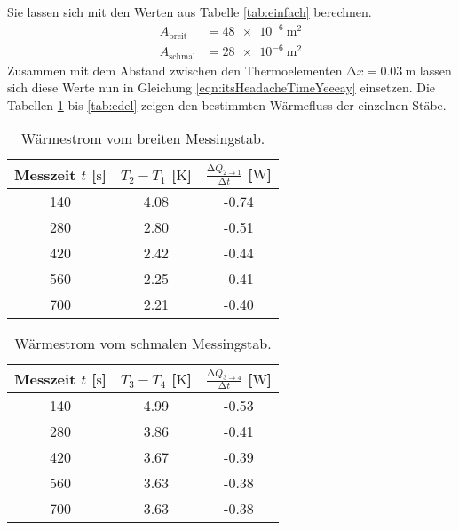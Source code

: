 Sie lassen sich mit den Werten aus Tabelle \ref{tab:einfach} berechnen. 
\begin{align}
A_{\text{breit}} &= \SI{48e-6}{\meter\squared}\\
A_{\text{schmal}} &= \SI{28e-6}{\meter\squared}
\end{align}
Zusammen mit dem Abstand zwischen den Thermoelementen $\increment x = \SI{0.03}{\meter}$ lassen sich diese Werte nun in Gleichung \ref{eqn:itsHeadacheTimeYeeeay} einsetzen. Die Tabellen \ref{tab:mesbreit} bis \ref{tab:edel} zeigen den bestimmten Wärmefluss
der einzelnen Stäbe.
\begin{table}
    \centering
    \caption{Wärmestrom vom breiten Messingstab.}
    \label{tab:mesbreit}
    \begin{tabular}{c c c}
        \toprule
        Messzeit $t$ [$\si{\second}$]   & $T_{2} - T_{1}$ [$\si{\kelvin}$] &  $\frac{\increment Q_{2 \to 1}}{\increment t}$ [$\si{\watt}$]  \\
        \midrule
        140     &   4.08   & -0.74   \\
        280     &   2.80   &  -0.51  \\
        420     &   2.42   &  -0.44  \\
        560     &   2.25   &   -0.41 \\
        700     &   2.21   &  -0.40  \\
        \bottomrule
    \end{tabular}
\end{table}
\begin{table}
    \centering
    \caption{Wärmestrom vom schmalen Messingstab.}
    \label{tab:messchmal}
    \begin{tabular}{c c c}
        \toprule
        Messzeit $t$ [$\si{\second}$]   & $T_{3} - T_{4}$ [$\si{\kelvin}$] &  $\frac{\increment Q_{3 \to 4}}{\increment t}$ [$\si{\watt}$]  \\
        \midrule
        140     &   4.99   & -0.53   \\
        280     &   3.86   &  -0.41  \\
        420     &   3.67   &  -0.39  \\
        560     &   3.63   &   -0.38 \\
        700     &   3.63   &  -0.38 \\
        \bottomrule
    \end{tabular}
\end{table}
